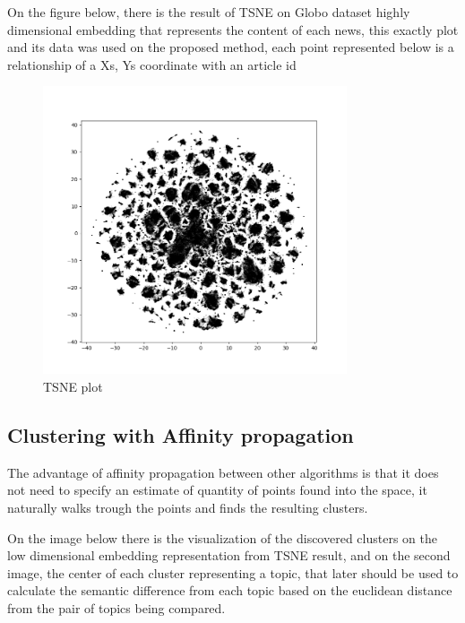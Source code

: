 \documentclass[ecp,tc,english]{iiufrgs}
\begin{document}
        On the figure below, there is the result of TSNE on Globo dataset highly dimensional embedding that represents the content of each news, this exactly plot and its data was used on the proposed method, each point represented below is a relationship of a Xs, Ys coordinate with an article id 
        \par
            \begin{figure}
                \centering
                \includegraphics[width=0.8\textwidth]{images/tsne_clusters.png}
                \caption{TSNE plot}
                \label{fig:my_label}
            \end{figure}
        
        \subsection{Clustering with Affinity propagation}

        The advantage of affinity propagation between other algorithms is that it does not need to specify an estimate of quantity of points found into the space, it naturally walks trough the points and finds the resulting clusters.

        On the image below there is the visualization of the discovered clusters on the low dimensional embedding representation from TSNE result, and on the second image, the center of each cluster representing a topic, that later should be used to calculate the semantic difference from each topic based on the euclidean distance from the pair of topics being compared.
         
\end{document}
